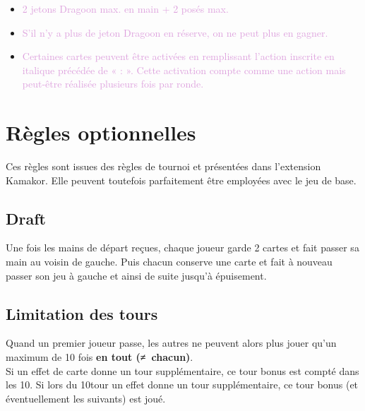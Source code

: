 \documentclass[10pt, a4paper]{article}	%
\begin{document}
\begin{multicols}{3}
\begin{itemize}
	\item \textcolor{Plum}{2 jetons Dragoon max. en main + 2 posés max.}
	\item \textcolor{Plum}{S’il n’y a plus de jeton Dragoon en réserve, on ne peut plus en gagner.}
	\item \textcolor{Plum}{Certaines cartes peuvent être activées en remplissant l’action inscrite en italique précédée de « : ». Cette activation compte comme une action mais peut-être réalisée plusieurs fois par ronde.}
\end{itemize}


\vspace{4cm}
\section{Règles optionnelles}
\label{sec:regles_optionnelles}

Ces règles sont issues des règles de tournoi et présentées dans l’extension Kamakor. Elle peuvent toutefois parfaitement être employées avec le jeu de base.

\subsection*{Draft}
Une fois les mains de départ reçues, chaque joueur garde 2 cartes et fait passer sa main au voisin de gauche. Puis chacun conserve une carte et fait à nouveau passer son jeu à gauche et ainsi de suite jusqu’à épuisement.


\subsection*{Limitation des tours}
Quand un premier joueur passe, les autres ne peuvent alors plus jouer qu’un maximum de 10 fois \textbf{en tout (≠ chacun)}.\\
Si un effet de carte donne un tour supplémentaire, ce tour bonus est compté dans les 10.
Si lors du 10\ieme tour un effet donne un tour supplémentaire, ce tour bonus (et éventuellement les suivants) est joué.



\end{multicols}
\end{document}
